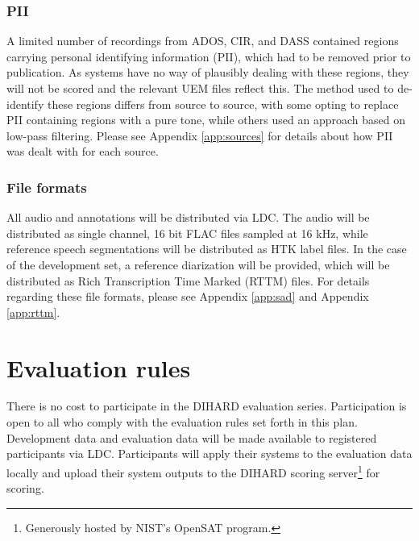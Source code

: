 \documentclass{article}
\begin{document}
\subsubsection{PII}
A limited number of recordings from ADOS, CIR, and DASS contained regions carrying  personal identifying information (PII), which had to be removed prior to publication. As systems have no way of plausibly dealing with these regions, they will not be scored and the relevant UEM files reflect this.  The method used to de-identify these regions differs from source to source, with some opting to replace PII containing regions with a pure tone, while others used an approach based on low-pass filtering. Please see Appendix \ref{app:sources} for details about how PII was dealt with for each source. 


\subsubsection{File formats}
All audio and annotations will be distributed via LDC. The audio will be distributed as single channel, 16 bit FLAC files sampled at 16 kHz, while reference speech segmentations will be distributed as HTK label files. In the case of the development set, a reference diarization will be provided, which will be distributed as  Rich Transcription Time Marked (RTTM) files. For details regarding these file formats, please see Appendix \ref{app:sad} and Appendix \ref{app:rttm}.






\section{Evaluation rules}
\label{sec:rules}
There is no cost to participate in the DIHARD evaluation series. Participation is open to all who comply with the evaluation rules set forth in this plan. Development data and evaluation data will be made available to registered participants via LDC. Participants will apply their systems to the evaluation data locally and upload their system outputs to the DIHARD scoring server\footnote{Generously hosted by NIST's OpenSAT program.} for scoring. 
\end{document}
